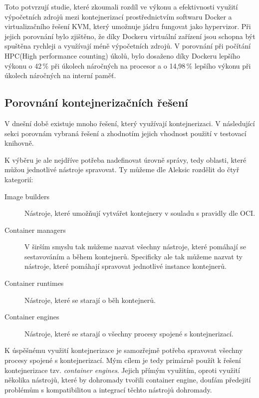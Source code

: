 Toto potvrzují studie, které zkoumali rozdíl ve výkonu a efektivnosti využití výpočetních zdrojů mezi kontejnerizací prostřednictvím softwaru Docker a virtualizačního řešení KVM, který umožnuje jádru fungovat jako hypervizor. Při jejich porovnání bylo zjištěno, že díky Dockeru virtuální zařízení jsou schopna být spuštěna rychleji a využívají méně výpočetních zdrojů. V porovnání při počítání HPC(High performance counting) úkolů, bylo dosaženo díky Dockeru lepšího výkonu o 42\,\% při úkolech náročných na procesor a o 14,98\,\% lepšího výkonu při úkolech náročných na interní paměť.\cite{kvmdockercomp}\cite{2021virt} 


\subsection{Porovnání kontejnerizačních řešení}

V dnešní době existuje mnoho řešení, který využívají kontejnerizaci. V následující sekci porovnám vybraná řešení a zhodnotím jejich vhodnost použití v testovací knihovně. 

K výběru je ale nejdříve potřeba nadefinovat úrovně správy, tedy oblasti, které můžou jednotlivé nástroje spravovat. Ty můžeme dle Aleksic\cite{docker_alt_23} rozdělit do čtyř kategorií:

\begin{description}
    \item[Image builders] Nástroje, které umožňují vytvářet kontejnery v souladu s pravidly dle OCI.
    \item[Container managers] V širším smyslu tak můžeme nazvat všechny nástroje, které pomáhají se sestavováním a během kontejnerů. Specificky ale tak můžeme nazvat ty nástroje, které pomáhají spravovat jednotlivé instance kontejnerů.
    \item[Container runtimes] Nástroje, které se starají o běh kontejnerů.
    \item[Container engines] Nástroje, které se starají o všechny procesy spojené s  kontejnerizací.
\end{description}

K úspěšnému využití kontejnerizace je samozřejmě potřeba spravovat všechny procesy spojené s kontejnerizací. Mým cílem je tedy primárně použít k řešení kontejnerizace tzv. \textit{container engines}. Jejich přímým využitím, oproti využití několika nástrojů, které by dohromady tvořili container engine, doufám předejití problémům s kompatibilitou a integrací těchto nástrojů dohromady.

